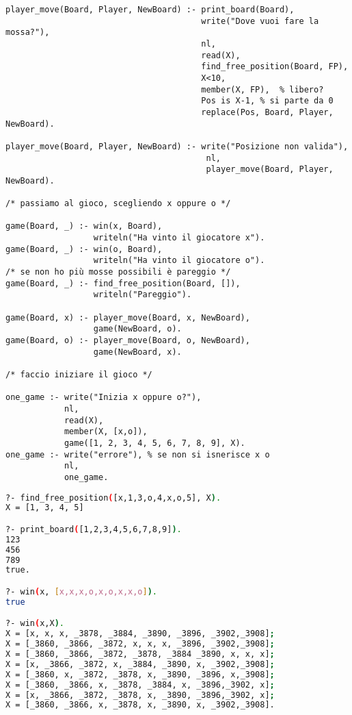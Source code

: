 \documentclass[a4paper,12pt, oneside]{book}
\begin{document}
\begin{esercizio}
\begin{verbatim}
player_move(Board, Player, NewBoard) :- print_board(Board),
                                        write("Dove vuoi fare la mossa?"),
                                        nl,
                                        read(X),
                                        find_free_position(Board, FP),
                                        X<10,
                                        member(X, FP),  % libero?
                                        Pos is X-1, % si parte da 0
                                        replace(Pos, Board, Player, NewBoard).

player_move(Board, Player, NewBoard) :- write("Posizione non valida"),
                                         nl,
                                         player_move(Board, Player, NewBoard).

/* passiamo al gioco, scegliendo x oppure o */

game(Board, _) :- win(x, Board),
                  writeln("Ha vinto il giocatore x").
game(Board, _) :- win(o, Board),
                  writeln("Ha vinto il giocatore o").
/* se non ho più mosse possibili è pareggio */
game(Board, _) :- find_free_position(Board, []),
                  writeln("Pareggio").

game(Board, x) :- player_move(Board, x, NewBoard),
                  game(NewBoard, o).
game(Board, o) :- player_move(Board, o, NewBoard),
                  game(NewBoard, x).

/* faccio iniziare il gioco */

one_game :- write("Inizia x oppure o?"),
            nl,
            read(X),
            member(X, [x,o]),
            game([1, 2, 3, 4, 5, 6, 7, 8, 9], X).
one_game :- write("errore"), % se non si isnerisce x o
            nl,
            one_game.
\end{verbatim}

\begin{shaded}
\begin{lstlisting}[language=bash]
?- find_free_position([x,1,3,o,4,x,o,5], X).
X = [1, 3, 4, 5] 

?- print_board([1,2,3,4,5,6,7,8,9]).
123
456
789
true.

?- win(x, [x,x,x,o,x,o,x,x,o]).
true 

?- win(x,X).
X = [x, x, x, _3878, _3884, _3890, _3896, _3902,_3908];
X = [_3860, _3866, _3872, x, x, x, _3896, _3902,_3908];
X = [_3860, _3866, _3872, _3878, _3884 _3890, x, x, x];
X = [x, _3866, _3872, x, _3884, _3890, x, _3902,_3908];
X = [_3860, x, _3872, _3878, x, _3890, _3896, x,_3908];
X = [_3860, _3866, x, _3878, _3884, x, _3896,_3902, x];
X = [x, _3866, _3872, _3878, x, _3890, _3896,_3902, x];
X = [_3860, _3866, x, _3878, x, _3890, x, _3902,_3908].


\end{lstlisting}
\end{shaded}
\end{esercizio}
\end{document}
